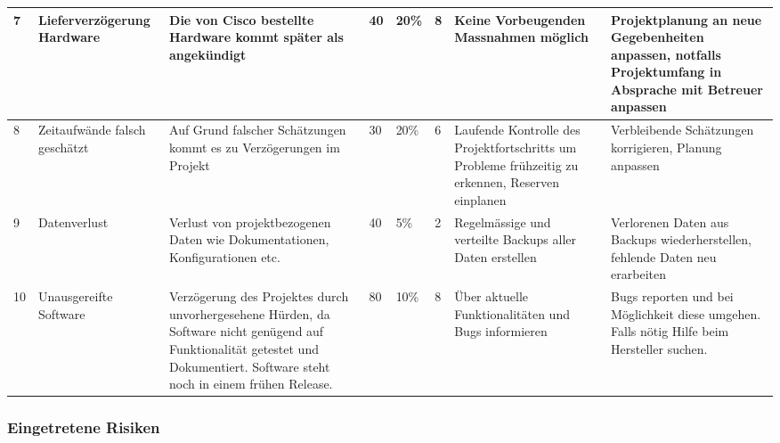 \begin{landscape}
\begin{longtable}{|m{0.5cm}|m{3cm}|m{5cm}|m{0.75cm}|m{0.75cm}|m{0.75cm}|m{5cm}|m{5cm}|}
	\hline
	7 & Lieferverzögerung Hardware & Die von Cisco bestellte Hardware kommt später als angekündigt & 40 & 20\% & 8 & Keine Vorbeugenden Massnahmen möglich & Projektplanung an neue Gegebenheiten anpassen, notfalls Projektumfang in Absprache mit Betreuer anpassen \\
	\hline
	8 & Zeitaufwände falsch geschätzt & Auf Grund falscher Schätzungen kommt es zu Verzögerungen im Projekt & 30 & 20\% & 6 & Laufende Kontrolle des Projektfortschritts um Probleme frühzeitig zu erkennen, Reserven einplanen & Verbleibende Schätzungen korrigieren, Planung anpassen \\
	\hline
	9 & Datenverlust & Verlust von projektbezogenen Daten wie Dokumentationen, Konfigurationen etc. & 40 & 5\% & 2 & Regelmässige und verteilte Backups aller Daten erstellen & Verlorenen Daten aus Backups wiederherstellen, fehlende Daten neu erarbeiten \\
	\hline
	10 & Unausgereifte Software & Verzögerung des Projektes durch unvorhergesehene Hürden, da Software nicht genügend auf Funktionalität getestet und Dokumentiert. Software steht noch in einem frühen Release. & 80 & 10\% & 8 & Über aktuelle Funktionalitäten und Bugs informieren & Bugs reporten und bei Möglichkeit diese umgehen. Falls nötig Hilfe beim Hersteller suchen. \\
	\hline
\end{longtable}

\end{landscape}



\subsubsection{Eingetretene Risiken}
